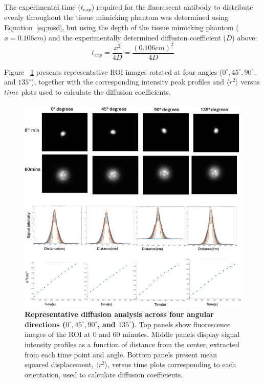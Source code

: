 The experimental time ($t_{exp}$) required for the fluorescent antibody to distribute evenly throughout the 
tissue mimicking phantom was determined using Equation~\ref{eq:msd}, but using the depth of the tissue mimicking 
phantom ($x = 0.106 cm$) and the experimentally determined diffusion coefficient ($D$) above:
\begin{equation}
\label{eq:texp}
    t_{exp} = \frac{x^2}{4D} = \frac{\left(0.106cm\right)^2}{4D}
\end{equation}

Figure ~\ref{fig:representative_of_difusion_time} presents representative ROI images rotated at four angles ($0^\circ, 45^\circ, 90^\circ,$ and $135^\circ$), together with the corresponding intensity peak profiles and $\langle r^2 \rangle$ versus $time$ plots used to calculate the diffusion coefficients.

\begin{figure}[H]
    \centering
    \includegraphics[width=0.98\linewidth]{figures/representative_of difusion_time.png}
    \captionsetup{justification=raggedright,singlelinecheck=false}
    \caption[Representative diffusion analysis]{\textbf{Representative diffusion analysis across four angular directions ($0^\circ, 45^\circ, 90^\circ$, and $135^\circ$)}. 
    Top panels show fluorescence images of the ROI at $0$ and $60$ minutes. Middle panels display signal 
    intensity profiles as a function of distance from the center, extracted from each time point and angle. 
    Bottom panels present mean squared displacement, $\langle r^2 \rangle$, versus time plots corresponding to each orientation, 
    used to calculate diffusion coefficients.}
    \label{fig:representative_of_difusion_time}
\end{figure}


